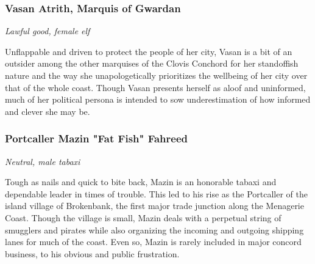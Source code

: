 \documentclass[10pt,a4paper,twoside,bg=print,twocolumn,openany,nodeprecatedcode]{dndbook}
\begin{document}
\subsubsection{Vasan Atrith, Marquis of Gwardan}
\textit{Lawful good, female elf}

Unflappable and driven to protect the people of her city, Vasan is a bit of an outsider among the other marquises of the Clovis Conchord for her standoffish nature and the way she unapologetically prioritizes the wellbeing of her city over that of the whole coast. Though Vasan presents herself as aloof and uninformed, much of her political persona is intended to sow underestimation of how informed and clever she may be.

\subsubsection{Portcaller Mazin "Fat Fish" Fahreed}
\textit{Neutral, male tabaxi}

Tough as nails and quick to bite back, Mazin is an honorable tabaxi and dependable leader in times of trouble. This led to his rise as the Portcaller of the island village of Brokenbank, the first major trade junction along the Menagerie Coast. Though the village is small, Mazin deals with a perpetual string of smugglers and pirates while also organizing the incoming and outgoing shipping lanes for much of the coast. Even so, Mazin is rarely included in major concord business, to his obvious and public frustration.
\end{document}
